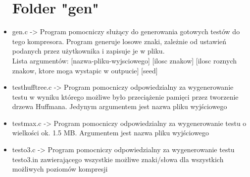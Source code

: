 \documentclass[]{article}
\begin{document}
\begin{itemize}
\section{Folder "gen"}\label{header-n231}
\item
gen.c -> Program pomocniczy służący do generowania gotowych testów do tego kompresora. Program generuje losowe znaki, zależnie od ustawień podanych przez użytkownika i zapisuje je w pliku.\\ Lista argumentów: [nazwa-pliku-wyjsciowego] [ilosc znakow] [ilosc roznych znakow, ktore moga wystapic w outpucie] [seed]
\item
testhufftree.c -> Program pomocniczy odpowiedzialny za wygenerowanie testu w wyniku którego możliwe było przeciążenie pamięci przez tworzenie drzewa Huffmana. Jedynym argumentem jest nazwa pliku wyjściowego
\item
testmax.c -> Program pomocniczy odpowiedzialny za wygenerowanie testu o wielkości ok. 1.5 MB. Argumentem jest nazwa pliku wyjściowego
\item
testo3.c -> Program pomocniczy odpowiedzialny za wygenerowanie testu testo3.in zawierającego wszystkie możliwe znaki/słowa dla wszystkich możliwych poziomów kompresji

\end{itemize}
\end{document}
